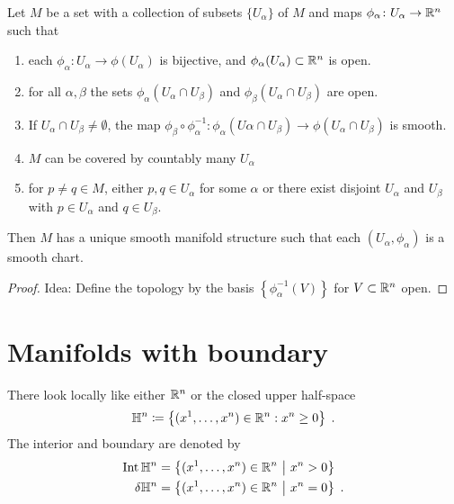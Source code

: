 \documentclass{skript}
\begin{document}
\begin{lemma}
    Let $M$ be a set with a collection of subsets $\{U_\alpha\}$ of $M$ and maps $\phi_\alpha\colon U_\alpha \to \mathbb{R}^n$ such that
    \begin{enumerate}
        \item 
            each $\phi_\alpha\colon U_\alpha\to \phi(U_\alpha)$ is bijective, and $\phi_\alpha(U_\alpha)\subset \mathbb{R}^n$ is open.
        \item
            for all $\alpha, \beta$ the sets $\phi_\alpha(U_\alpha\cap U_\beta)$ and $\phi_\beta(U_\alpha\cap U_\beta)$ are open.
        \item
            If $U_\alpha\cap U_\beta \neq \emptyset$, the map $\phi_\beta\circ\phi_\alpha^{-1}\colon \phi_\alpha(U\alpha\cap U_\beta) \to \phi(U_\alpha\cap U_\beta)$ is smooth.
        \item
            $M$ can be covered by countably many $U_\alpha$
        \item
            for $p\neq q\in M$, either $p,q\in U_\alpha$ for some $\alpha$ or there exist disjoint $U_\alpha$ and $U_\beta$ with $p\in U_\alpha$ and $q\in U_\beta$.
    \end{enumerate}
    Then $M$ has a unique smooth manifold structure such that each $(U_\alpha, \phi_\alpha)$ is a smooth chart.
\end{lemma}
\begin{proof}
    Idea: Define the topology by the basis $\left\{\phi_\alpha^{-1}(V)\right\}$ for $V\subset\mathbb{R}^n$ open.
\end{proof}

\section{Manifolds with boundary}
There look locally like either $\mathbb{R}^n$ or the closed upper half-space 
\begin{align*}
    \mathbb{H}^n\coloneqq \left\{(x^1,\dots, x^n)\in \mathbb{R}^n: x^n\geq 0\right\}\;.
\end{align*}
The interior and boundary are denoted by
\begin{align*}
    \operatorname{Int} \mathbb{H}^n   &= \left\{(x^1,\dots, x^n) \in \mathbb{R}^n \ \middle|\  x^n > 0\right\}\\
    \delta \mathbb{H}^n &= \left\{(x^1,\dots, x^n) \in \mathbb{R}^n \ \middle|\  x^n = 0\right\}\;.
\end{align*}
\end{document}
